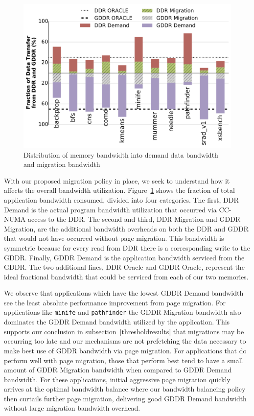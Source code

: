 \begin{figure}[bh!]
    \includegraphics[width=\columnwidth]{hpca2015/figures/bw-util.png}
    \caption{Distribution of memory bandwidth into demand data bandwidth and
migration bandwidth}
    \label{fig:bwutil}
\end{figure}

With our proposed migration policy in place, we seek to understand how it affects the overall bandwidth utilization.  
Figure~\ref{fig:bwutil} shows the fraction of total application bandwidth consumed, divided
into four categories.  The first, DDR Demand is the actual program bandwidth utilization that occurred via CC-NUMA
access to the DDR.  The second and third, DDR Migration and GDDR Migration, are the additional bandwidth overheads on
both the DDR and GDDR that would not have occurred without page migration.  This bandwidth is symmetric because for every read from DDR there is a corresponding write to the GDDR.  Finally, GDDR Demand is the application
bandwidth serviced from the GDDR.  The two additional lines, DDR Oracle and GDDR Oracle, represent
the ideal fractional bandwidth that could be serviced from each of our two memories.

We observe that applications which have the lowest GDDR Demand bandwidth see the least absolute performance improvement from
page migration.  For applications like {\tt minife} and {\tt pathfinder} the GDDR Migration bandwidth also dominates
the GDDR Demand bandwidth utilized by the application. This supports our
conclusion in subsection~\ref{thresholdresults} that migrations may be occurring too late and our mechanisms are not
prefetching the data necessary to make best use of GDDR bandwidth via page migration.  For applications that do perform well 
with page migration, those that perform best tend to have a small amount of GDDR Migration bandwidth when compared to GDDR Demand bandwidth.
For these applications, initial aggressive page migration quickly arrives at the optimal bandwidth balance where our
bandwidth balancing policy then curtails further page migration, delivering good GDDR Demand bandwidth without large migration
bandwidth overhead.

